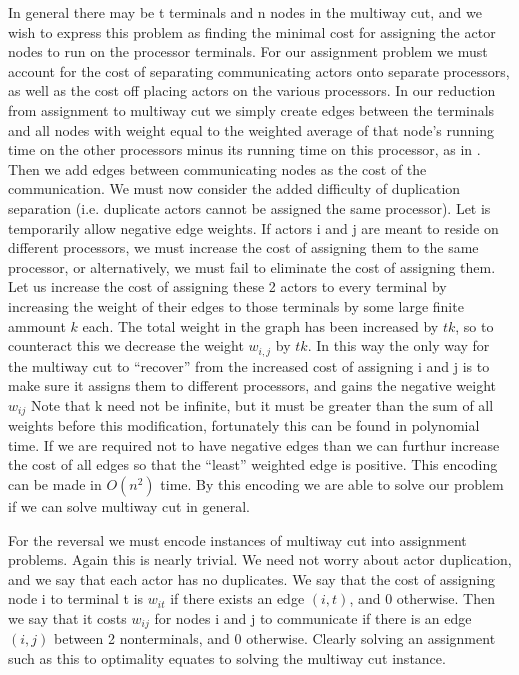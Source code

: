 \documentclass{article}
\begin{document}
In general there may be t terminals and n nodes in the multiway cut, and we wish to express this problem as finding the minimal cost for assigning the actor nodes to run on the processor terminals.
For our assignment problem we must account for the cost of separating communicating actors onto separate processors, as well as the cost off placing actors on the various processors.
In our reduction from assignment to multiway cut we simply create edges between the terminals and all nodes with weight equal to the weighted average of that node's running time on the other processors minus its running time on this processor, as in \cite{sto77}.
Then we add edges between communicating nodes as the cost of the communication.
We must now consider the added difficulty of duplication separation (i.e. duplicate actors cannot be assigned the same processor).
Let is temporarily allow negative edge weights.
If actors i and j are meant to reside on different processors, we must increase the cost of assigning them to the same processor, or alternatively, we must fail to eliminate the cost of assigning them.
Let us increase the cost of assigning these 2 actors to every terminal by increasing the weight of their edges to those terminals by some large finite ammount $k$ each.
The total weight in the graph has been increased by $tk$, so to counteract this we decrease the weight $w_{i,j}$ by $tk$.
In this way the only way for the multiway cut to ``recover'' from the increased cost of assigning i and j is to make sure it assigns them to different processors, and gains the negative weight $w_{ij}$
Note that k need not be infinite, but it must be greater than the sum of all weights before this modification, fortunately this can be found in polynomial time.
If we are required not to have negative edges than we can furthur increase the cost of all edges so that the ``least'' weighted edge is positive.
This encoding can be made in $O(n^2)$ time.
By this encoding we are able to solve our problem if we can solve multiway cut in general.

For the reversal we must encode instances of multiway cut into assignment problems.
Again this is nearly trivial.
We need not worry about actor duplication, and we say that each actor has no duplicates.
We say that the cost of assigning node i to terminal t is $w_{it}$ if there exists an edge $(i,t)$, and 0 otherwise.
Then we say that it costs $w_{ij}$ for nodes i and j to communicate if there is an edge $(i,j)$ between 2 nonterminals, and 0 otherwise.
Clearly solving an assignment such as this to optimality equates to solving the multiway cut instance.



\end{document}
